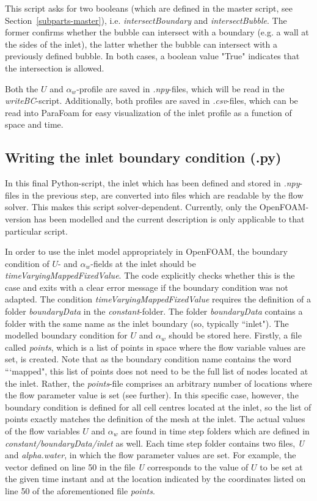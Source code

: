 \documentclass[fleqn,10pt,a4paper,twoside,english]{book}
\begin{document}
\par This script asks for two booleans (which are defined in the master script, see \mbox{Section \ref{subparts-master}}), i.e. \textit{intersectBoundary} and \textit{intersectBubble}. The former confirms whether the bubble can intersect with a boundary (e.g. a wall at the sides of the inlet), the latter whether the bubble can intersect with a previously defined bubble. In both cases, a boolean value "True" indicates that the intersection is allowed.
\par Both the $U$ and $\alpha_{w}$-profile are saved in \textit{.npy}-files, which will be read in the \textit{writeBC}-script. Additionally, both profiles are saved in \textit{.csv}-files, which can be read into ParaFoam for easy visualization of the inlet profile as a function of space and time. 
\subsection{Writing the inlet boundary condition (.py) \label{subparts-writing}}
In this final Python-script, the inlet which has been defined and stored in \textit{.npy}-files in the previous step, are converted into files which are readable by the flow solver. This makes this script solver-dependent. Currently, only the OpenFOAM-version has been modelled and the current description is only applicable to that particular script. 
\par In order to use the inlet model appropriately in OpenFOAM, the boundary condition of $U$- and $\alpha_{w}$-fields at the inlet should be \textit{timeVaryingMappedFixedValue}. The code explicitly checks whether this is the case and exits with a clear error message if the boundary condition was not adapted. The condition \textit{timeVaryingMappedFixedValue} requires the definition of a folder \textit{boundaryData} in the \textit{constant}-folder. The folder \textit{boundaryData} contains a folder with the same name as the inlet boundary (so, typically ``inlet"). The modelled boundary condition for $U$ and $\alpha_{w}$ should be stored here. Firstly, a file called \textit{points}, which is a list of points in space where the flow variable values are set, is created. Note that as the boundary condition name contains the word ```mapped", this list of points does not need to be the full list of nodes located at the inlet. Rather, the \textit{points}-file comprises an arbitrary number of locations where the flow parameter value is set (see further). In this specific case, however, the boundary condition is defined for all cell centres located at the inlet, so the list of points exactly matches the definition of the mesh at the inlet. The actual values of the flow variables $U$ and $\alpha_{w}$ are found in time step folders which are defined in \textit{constant/boundaryData/inlet} as well. Each time step folder contains two files, \textit{U} and \textit{alpha.water}, in which the flow parameter values are set. For example, the vector defined on line 50 in the file \textit{U} corresponds to the value of $U$ to be set at the given time instant and at the location indicated by the coordinates listed on line 50 of the aforementioned file \textit{points}.
\end{document}

